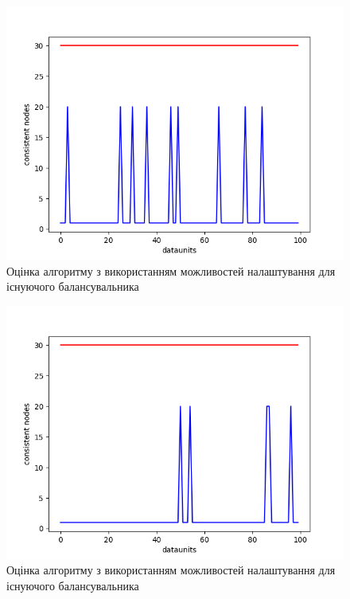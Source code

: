 \documentclass[14pt]{vakthesis}
\begin{document}
\begin{figure}
\centering

\includegraphics[width=\linewidth]{images/own_balancing/w_3000_r_500.png}

     \caption{Оцінка алгоритму з використанням можливостей налаштування для існуючого балансувальника}
     \label{fig:own_alg_3000}
\end{figure}

\begin{figure}
\centering

\includegraphics[width=\linewidth]{images/own_balancing/w_5000_r_500.png}

     \caption{Оцінка алгоритму з використанням можливостей налаштування для існуючого балансувальника}
     \label{fig:own_alg_5000}
\end{figure}
\end{document}

